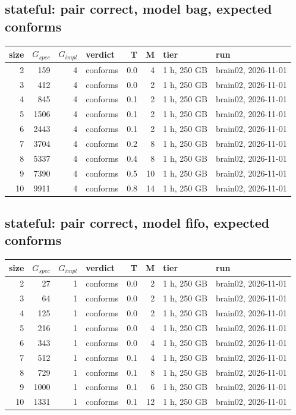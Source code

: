 \documentclass[10pt]{article}
\begin{document}
\subsection*{stateful: pair \textsf{correct}, model bag, expected conforms}
\begin{longtable}{@{}rrrlrrll@{}}
\toprule
size & $G_{\mathit{spec}}$ & $G_{\mathit{impl}}$ & verdict & T & M & tier & run \\
\midrule
\endhead
\color{blue} 2 & 159 & 4 & conforms & 0.0 & 4 & 1 h, 250 GB & brain02, 2026-11-01 \\
\color{blue} 3 & 412 & 4 & conforms & 0.0 & 2 & 1 h, 250 GB & brain02, 2026-11-01 \\
\color{blue} 4 & 845 & 4 & conforms & 0.1 & 2 & 1 h, 250 GB & brain02, 2026-11-01 \\
\color{blue} 5 & 1506 & 4 & conforms & 0.1 & 2 & 1 h, 250 GB & brain02, 2026-11-01 \\
\color{blue} 6 & 2443 & 4 & conforms & 0.1 & 2 & 1 h, 250 GB & brain02, 2026-11-01 \\
\color{blue} 7 & 3704 & 4 & conforms & 0.2 & 8 & 1 h, 250 GB & brain02, 2026-11-01 \\
\color{blue} 8 & 5337 & 4 & conforms & 0.4 & 8 & 1 h, 250 GB & brain02, 2026-11-01 \\
\color{blue} 9 & 7390 & 4 & conforms & 0.5 & 10 & 1 h, 250 GB & brain02, 2026-11-01 \\
\color{blue} 10 & 9911 & 4 & conforms & 0.8 & 14 & 1 h, 250 GB & brain02, 2026-11-01 \\
\bottomrule
\end{longtable}
\subsection*{stateful: pair \textsf{correct}, model fifo, expected conforms}
\begin{longtable}{@{}rrrlrrll@{}}
\toprule
size & $G_{\mathit{spec}}$ & $G_{\mathit{impl}}$ & verdict & T & M & tier & run \\
\midrule
\endhead
\color{blue} 2 & 27 & 1 & conforms & 0.0 & 2 & 1 h, 250 GB & brain02, 2026-11-01 \\
\color{blue} 3 & 64 & 1 & conforms & 0.0 & 2 & 1 h, 250 GB & brain02, 2026-11-01 \\
\color{blue} 4 & 125 & 1 & conforms & 0.0 & 2 & 1 h, 250 GB & brain02, 2026-11-01 \\
\color{blue} 5 & 216 & 1 & conforms & 0.0 & 4 & 1 h, 250 GB & brain02, 2026-11-01 \\
\color{blue} 6 & 343 & 1 & conforms & 0.0 & 4 & 1 h, 250 GB & brain02, 2026-11-01 \\
\color{blue} 7 & 512 & 1 & conforms & 0.1 & 4 & 1 h, 250 GB & brain02, 2026-11-01 \\
\color{blue} 8 & 729 & 1 & conforms & 0.1 & 8 & 1 h, 250 GB & brain02, 2026-11-01 \\
\color{blue} 9 & 1000 & 1 & conforms & 0.1 & 6 & 1 h, 250 GB & brain02, 2026-11-01 \\
\color{blue} 10 & 1331 & 1 & conforms & 0.1 & 12 & 1 h, 250 GB & brain02, 2026-11-01 \\
\bottomrule
\end{longtable}
\end{document}

